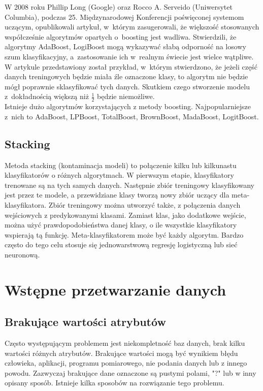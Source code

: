 W 2008 roku Phillip Long (Google) oraz Rocco A. Serveido (Uniwersytet Columbia), podczas 25. Międzynarodowej Konferencji poświęconej systemom uczącym, opublikowali artykuł, w którym zasugerowali, że większość stosowanych współcześnie algorytmów opartych o boosting jest wadliwa. Stwierdzili, że algorytmy AdaBoost, LogiBoost mogą wykazywać słabą odporność na losowy szum klasyfikacyjny, a zastosowanie ich w realnym świecie jest wielce wątpliwe. W artykule przedstawiony został przykład, w którym stwierdzono, że jeżeli część danych treningowych będzie miała źle oznaczone klasy, to algorytm nie będzie mógł poprawnie sklasyfikować tych danych. Skutkiem czego stworzenie modelu z dokładnością większą niż $\frac{1}{2}$ będzie niemożliwe. \\
Istnieje dużo algorytmów korzystających z metody boosting. Najpopularniejsze z nich to AdaBoost, LPBoost, TotalBoost, BrownBoost, MadaBoost, LogitBoost.
\subsection{Stacking}
Metoda stacking (kontaminacja modeli) to połączenie kilku lub kilkunastu klasyfikatorów o różnych algorytmach. W pierwszym etapie, klasyfikatory trenowane są na tych samych danych. Następnie zbiór treningowy klasyfikowany jest przez te modele, a przewidziane klasy tworzą nowy zbiór uczący dla meta-klasyfikatora. Zbiór treningowy można utworzyć także, z połączenia danych wejściowych z predykowanymi klasami. Zamiast klas, jako dodatkowe wejście, można użyć prawdopodobieństwa danej klasy, o ile wszystkie klasyfikatory wspierają tą funkcję. Meta-klasyfikatorem może być każdy algorytm. Bardzo często do tego celu stosuje się jednowarstwową regresję logistyczną lub sieć neuronową. 
\section{Wstępne przetwarzanie danych}
\subsection{Brakujące wartości atrybutów}
Często występującym problemem jest niekompletność baz danych, brak kilku wartości różnych atrybutów. Brakujące wartości mogą być wynikiem błędu człowieka, aplikacji, programu pomiarowego, nie podania danych lub z innego powodu. Zazwyczaj brakujące dane oznaczone są pustymi polami, "?" lub w inny opisany sposób. Istnieje kilka sposobów na rozwiązanie tego problemu.
